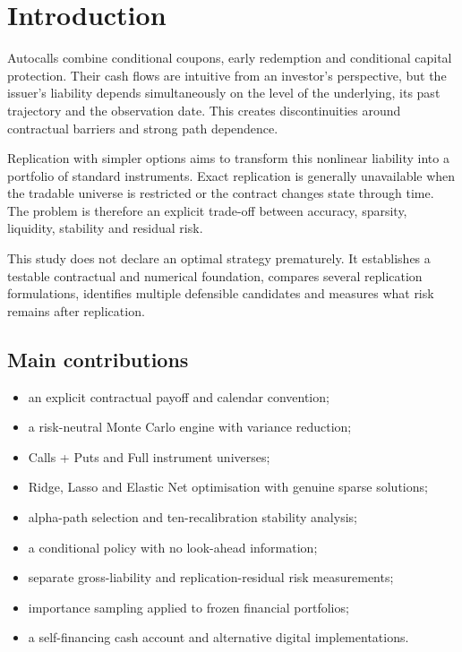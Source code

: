 \documentclass[11pt,a4paper]{article}
\begin{document}
\newpage
\tableofcontents
\newpage

\section{Introduction}

Autocalls combine conditional coupons, early redemption and conditional capital protection. Their cash flows are intuitive from an investor's perspective, but the issuer's liability depends simultaneously on the level of the underlying, its past trajectory and the observation date. This creates discontinuities around contractual barriers and strong path dependence.

Replication with simpler options aims to transform this nonlinear liability into a portfolio of standard instruments. Exact replication is generally unavailable when the tradable universe is restricted or the contract changes state through time. The problem is therefore an explicit trade-off between accuracy, sparsity, liquidity, stability and residual risk.

This study does not declare an optimal strategy prematurely. It establishes a testable contractual and numerical foundation, compares several replication formulations, identifies multiple defensible candidates and measures what risk remains after replication.

\subsection{Main contributions}

\begin{itemize}
\item an explicit contractual payoff and calendar convention;
\item a risk-neutral Monte Carlo engine with variance reduction;
\item Calls + Puts and Full instrument universes;
\item Ridge, Lasso and Elastic Net optimisation with genuine sparse solutions;
\item alpha-path selection and ten-recalibration stability analysis;
\item a conditional policy with no look-ahead information;
\item separate gross-liability and replication-residual risk measurements;
\item importance sampling applied to frozen financial portfolios;
\item a self-financing cash account and alternative digital implementations.
\end{itemize}
\end{document}
